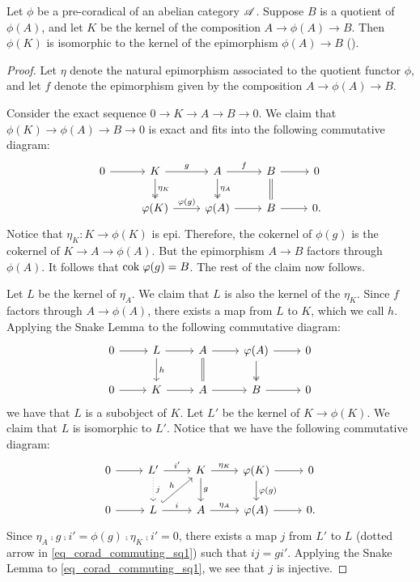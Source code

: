 \begin{prop}
Let $\phi$ be a pre-coradical of an abelian category $\mathscr{A}$. Suppose $B$ is a 
quotient of $\phi(A)$, and let $K$ be the kernel of the 
composition $A \to \phi(A) \to B$. Then $\phi(K)$ is isomorphic 
to the kernel of the epimorphism $\phi(A) \to B$ (\CF \cite[I2.3]{BJV}).
\end{prop}
\begin{proof}
Let $\eta$ denote the natural epimorphism associated to the 
quotient functor $\phi$, and let $f$ denote the epimorphism given 
by the composition $A \to \phi(A) \to B$.

Consider the exact sequence $0 \to K \to A \to B \to 0$. We claim
that $\phi(K) \to \phi(A) \to B \to 0$ is exact and fits into the 
following commutative diagram:
\[
\begin{tikzcd}
0 \arrow{r} &
K \arrow{r}{g} \arrow[twoheadrightarrow]{d}{\eta_K} &
A \arrow{r}{f} \arrow[twoheadrightarrow]{d}{\eta_A} &
B \arrow{r} \arrow[equal]{d} &
0 \\
& \phi(K) \arrow{r}{\phi(g)} &
\phi(A) \arrow{r} &
B \arrow{r} &
0.
\end{tikzcd}
\]
Notice that $\eta_K: K \to \phi(K)$ is epi. Therefore, the cokernel of
$\phi(g)$ is the cokernel of $K \to A \to \phi(A)$.  But the
epimorphism $A \to B$ factors through $\phi(A)$. It follows that $\mathrm{cok}\;
\varphi(g) = B$. The rest of the claim now follows.

Let $L$ be the kernel of $\eta_A$. We claim that $L$ is also the 
kernel of the $\eta_K$. Since $f$ factors through $A \to \phi(A)$,
there exists a map from $L$ to $K$, which we call $h$. Applying 
the Snake Lemma to the following commutative diagram:
\[
\begin{tikzcd}
0 \arrow{r} &
L \arrow{r} \arrow{d}{h} &
A \arrow{r} \arrow[equals]{d} &
\phi(A) \arrow{r}\arrow[twoheadrightarrow]{d} &
0 \\
0 \arrow{r} &
K \arrow{r} &
A \arrow{r} &
B \arrow{r} &
0
\end{tikzcd}
\]
we have that $L$ is a subobject of $K$. Let $L'$ be the kernel of
$K \to \phi(K)$. We claim that $L$ is isomorphic to $L'$. Notice
that we have the following commutative diagram:
\begin{equation}\label{eq_corad_commuting_sq1}
\begin{tikzcd}
0 \arrow{r} &
L' \arrow{r}{i'} \arrow[dotted]{d}{j} &
K \arrow{r}{\eta_K} \arrow{d}{g} &
\phi(K) \arrow{r}\arrow{d}{\phi(g)} &
0 \\
0 \arrow{r} &
L \arrow{r}{i}\arrow[hookrightarrow]{ru}{h} &
A \arrow{r}{\eta_A} &
\phi(A) \arrow{r} &
0.
\end{tikzcd}
\end{equation}
Since $\eta_A \comp g \comp i' = \phi(g) \comp \eta_K \comp i' = 
0$, there exists a map $j$ from $L'$ to $L$ (dotted arrow in 
\eqref{eq_corad_commuting_sq1}) such that $ij = gi'$. Applying the 
Snake Lemma to \eqref{eq_corad_commuting_sq1}, we see that $j$ is 
injective.


\end{proof}
